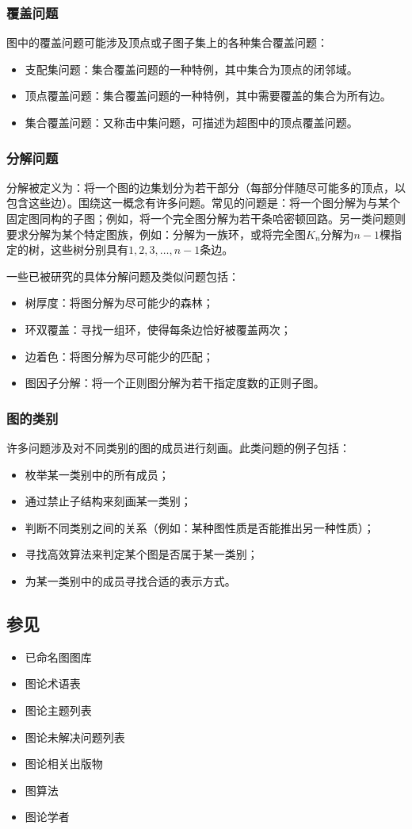 \subsubsection{覆盖问题}
图中的覆盖问题可能涉及顶点或子图子集上的各种集合覆盖问题：
\begin{itemize}
\item 支配集问题：集合覆盖问题的一种特例，其中集合为顶点的闭邻域。
\item 顶点覆盖问题：集合覆盖问题的一种特例，其中需要覆盖的集合为所有边。
\item 集合覆盖问题：又称击中集问题，可描述为超图中的顶点覆盖问题。
\end{itemize}
\subsubsection{分解问题}
分解被定义为：将一个图的边集划分为若干部分（每部分伴随尽可能多的顶点，以包含这些边）。围绕这一概念有许多问题。常见的问题是：将一个图分解为与某个固定图同构的子图；例如，将一个完全图分解为若干条哈密顿回路。另一类问题则要求分解为某个特定图族，例如：分解为一族环，或将完全图$K_n$分解为$n-1$棵指定的树，这些树分别具有$1,2,3,\ldots,n-1$条边。

一些已被研究的具体分解问题及类似问题包括：
\begin{itemize}
\item 树厚度：将图分解为尽可能少的森林；
\item 环双覆盖：寻找一组环，使得每条边恰好被覆盖两次；
\item 边着色：将图分解为尽可能少的匹配；
\item 图因子分解：将一个正则图分解为若干指定度数的正则子图。
\end{itemize}
\subsubsection{图的类别}
许多问题涉及对不同类别的图的成员进行刻画。此类问题的例子包括：
\begin{itemize}
\item 枚举某一类别中的所有成员；
\item 通过禁止子结构来刻画某一类别；
\item 判断不同类别之间的关系（例如：某种图性质是否能推出另一种性质）；
\item 寻找高效算法来判定某个图是否属于某一类别；
\item 为某一类别中的成员寻找合适的表示方式。
\end{itemize}
\subsection{参见}
\begin{itemize}
\item 已命名图图库
\item 图论术语表
\item 图论主题列表
\item 图论未解决问题列表
\item 图论相关出版物
\item 图算法
\item 图论学者
\end{itemize}

